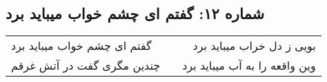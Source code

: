 \begin{center}
\section*{شماره ۱۲: گفتم ای چشم خواب میباید برد}
\label{sec:012}
\begin{longtable}{l p{0.5cm} r}
گفتم ای چشم خواب میباید برد
&&
بویی ز دل خراب میباید برد
\\
چندین مگری گفت در آتش غرقم
&&
وین واقعه را به آب میباید برد
\\
\end{longtable}
\end{center}
